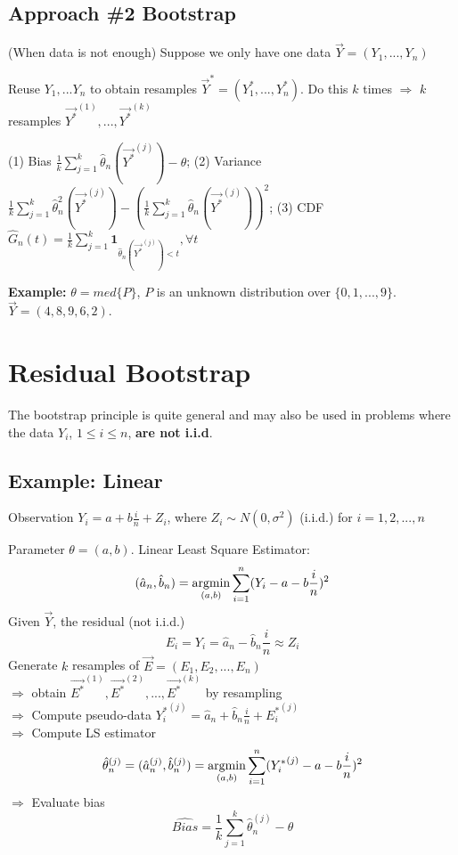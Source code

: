 \documentclass[11pt]{elegantbook}
\newcommand{\argmin}{\operatornamewithlimits{argmin}}
\begin{document}
\subsection*{Approach \#2 Bootstrap}(When data is not enough)
Suppose we only have one data $\vec{Y}=(Y_1,...,Y_n)$

Reuse $Y_1,...Y_n$ to obtain resamples $\vec{Y}^*=(Y_1^*,...,Y_n^*)$. Do this $k$ times $\Rightarrow$ $k$ resamples ${\vec{Y^*}}^{(1)},...,{\vec{Y^*}}^{(k)}$

(1) Bias $\frac{1}{k}\sum_{j=1}^k \hat{\theta}_n(\vec{Y^*}^{(j)})-\theta$; (2) Variance $\frac{1}{k}\sum_{j=1}^k \hat{\theta}^2_n(\vec{Y^*}^{(j)})-\left(\frac{1}{k}\sum_{j=1}^k \hat{\theta}_n(\vec{Y^*}^{(j)})\right)^2$; (3) CDF $\hat{G}_{n}(t)=\frac{1}{k}\sum_{j=1}^k \mathbf{1}_{\hat{\theta}_n(\vec{Y^*}^{(j)})<t},\forall t$

\textbf{Example:} $\theta=med\{P\}$, $P$ is an unknown distribution over $\{0,1,...,9\}$. $\vec{Y}=(4,8,9,6,2)$.



\section{Residual Bootstrap}
The bootstrap principle is quite general and may also be used in problems where the data $Y_i$, $1\leq i\leq n$, \textbf{are not i.i.d}.

\subsection*{Example: Linear}
Observation $Y_i=a+b\frac{i}{n}+Z_i$, where $Z_i\sim N(0,\sigma^2)$ (i.i.d.) for $i=1,2,...,n$

Parameter $\theta=(a,b)$. Linear Least Square Estimator:
$$(\hat{a}_n,\hat{b}_n)=\argmin_{(a,b)}\sum_{i=1}^n(Y_i-a-b\frac{i}{n})^2$$
Given $\vec{Y}$, the residual (not i.i.d.)$$E_i=Y_i=\hat{a}_n-\hat{b}_n\frac{i}{n}\approx Z_i$$
Generate $k$ resamples of $\vec{E}=(E_1,E_2,...,E_n)$\\
$\Rightarrow$ obtain $\vec{E^*}^{(1)},\vec{E^*}^{(2)},...,\vec{E^*}^{(k)}$ by resampling\\
$\Rightarrow$ Compute pseudo-data ${Y_i^*}^{(j)}=\hat{a}_n+\hat{b}_n\frac{i}{n}+{E_i^*}^{(j)}$\\
$\Rightarrow$ Compute LS estimator $$\hat{\theta}_n^{(j)}=(\hat{a}_n^{(j)},\hat{b}_n^{(j)})=\argmin_{(a,b)}\sum_{i=1}^n({Y_i^*}^{(j)}-a-b\frac{i}{n})^2$$
$\Rightarrow$ Evaluate bias $$\widehat{Bias}=\frac{1}{k}\sum_{j=1}^k \hat{\theta}_n^{(j)}-\theta$$
\end{document}
